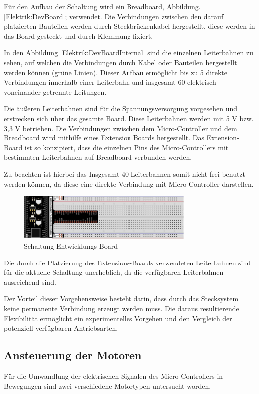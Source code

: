 \documentclass[conference,compsoc,final,a4paper]{IEEEtran}
\begin{document}
Für den Aufbau der Schaltung wird ein Breadboard, Abbildung. \ref{Elektrik:DevBoard}; verwendet. Die Verbindungen zwischen den darauf platzierten Bauteilen werden durch Steckbrückenkabel hergestellt, diese werden in das Board gesteckt und durch Klemmung fixiert.

In den Abbildung \ref{Elektrik:DevBoardInternal} sind die einzelnen Leiterbahnen zu sehen, auf welchen die Verbindungen durch Kabel oder Bauteilen hergestellt werden können (grüne Linien). 
Dieser Aufbau ermöglicht bis zu 5 direkte Verbindungen innerhalb einer Leiterbahn und insgesamt 60 elektrisch voneinander getrennte Leitungen.

\noindent Die äußeren Leiterbahnen sind für die Spannungsversorgung vorgesehen und erstrecken sich über das gesamte Board. Diese Leiterbahnen werden mit 5 V bzw. 3,3 V betrieben.
Die Verbindungen zwischen dem Micro-Controller und dem Breadboard wird mithilfe eines Extension Boards hergestellt. Das Extension-Board ist so konzipiert, 
dass die einzelnen Pins des Micro-Controllers mit bestimmten Leiterbahnen auf Breadboard verbunden werden.

\noindent Zu beachten ist hierbei das Insgesamt 40 Leiterbahnen somit nicht frei benutzt werden können, da diese eine direkte Verbindung mit Micro-Controller darstellen.
\begin{figure}[h]
\centering
\includegraphics[width=8.5cm]{../images/ext_board.png}
\caption{Schaltung Entwicklungs-Board \autocite{freenoveTutorial}}
\label{Elektrik:DevBoardext}
\end{figure}

\noindent Die durch die Platzierung des Extensions-Boards verwendeten Leiterbahnen sind für die aktuelle Schaltung unerheblich, da die verfügbaren Leiterbahnen ausreichend sind.

\noindent Der Vorteil dieser Vorgehensweise besteht darin, dass durch das Stecksystem keine permanente Verbindung erzeugt werden muss. 
Die daraus resultierende Flexibilität ermöglicht ein experimentelles Vorgehen und den Vergleich der potenziell verfügbaren Antriebsarten.

\subsection{Ansteuerung der Motoren}
Für die Umwandlung der elektrischen Signalen des Micro-Controllers in Bewegungen sind zwei verschiedene Motortypen untersucht worden.
\end{document}
